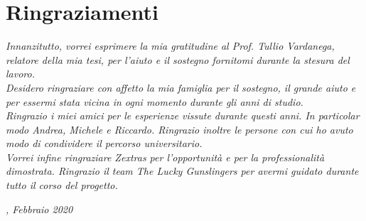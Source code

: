 
\cleardoublepage
{}
{}

\bigskip

\begingroup
\let\clearpage\relax
\let\cleardoublepage\relax
\let\cleardoublepage\relax

\chapter*{Ringraziamenti}

\noindent \textit{Innanzitutto, vorrei esprimere la mia gratitudine al Prof. Tullio Vardanega, relatore della mia tesi, per l'aiuto e il sostegno fornitomi durante la stesura del lavoro.}\\

\noindent \textit{Desidero ringraziare con affetto la mia famiglia per il sostegno, il grande aiuto e per essermi stata vicina in ogni momento durante gli anni di studio.}\\

\noindent \textit{Ringrazio i miei amici per le esperienze vissute durante questi anni. In particolar modo Andrea, Michele e Riccardo. Ringrazio inoltre le persone con cui ho avuto modo di condividere il percorso universitario.}\\

\noindent \textit{Vorrei infine ringraziare Zextras per l'opportunità e per la professionalità dimostrata. Ringrazio il team The Lucky Gunslingers per avermi guidato durante tutto il corso del progetto.}\\

\bigskip

\noindent\textit{\myLocation, Febbraio 2020}
\hfill \myName

\endgroup

